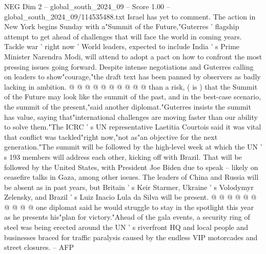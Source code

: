 \begin{textsample}{NEG Dim 2 – global\_south\_2024\_09 – Score 1.00 – global\_south\_2024\_09/114535488.txt}
Israel has yet to comment.
The action in New York begins Sunday with a"Summit of the Future,"Guterres ' flagship attempt to get ahead of challenges that will face the world in coming years.
Tackle war ' right now ' World leaders, expected to include India ' s Prime Minister Narendra Modi, will attend to adopt a pact on how to confront the most pressing issues going forward.
Despite intense negotiations and Guterres calling on leaders to show"courage,"the draft text has been panned by observers as badly lacking in ambition. @ @ @ @ @ @ @ @ @ @ than a risk, ( is ) that the Summit of the Future may look like the summit of the past, and in the best-case scenario, the summit of the present,"said another diplomat."Guterres insists the summit has value, saying that"international challenges are moving faster than our ability to solve them."The ICRC ' s UN representative Laetitia Courtois said it was vital that conflict was tackled"right now,"not as"an objective for the next generation."The summit will be followed by the high-level week at which the UN ' s 193 members will address each other, kicking off with Brazil.
That will be followed by the United States, with President Joe Biden due to speak -- likely on ceasefire talks in Gaza, among other issues.
The leaders of China and Russia will be absent as in past years, but Britain ' s Keir Starmer, Ukraine ' s Volodymyr Zelensky, and Brazil ' s Luiz Inacio Lula da Silva will be present. @ @ @ @ @ @ @ @ @ @ one diplomat said he would struggle to stay in the spotlight this year as he presents his"plan for victory."Ahead of the gala events, a security ring of steel was being erected around the UN ' s riverfront HQ and local people and businesses braced for traffic paralysis caused by the endless VIP motorcades and street closures. -- AFP

\end{textsample}
